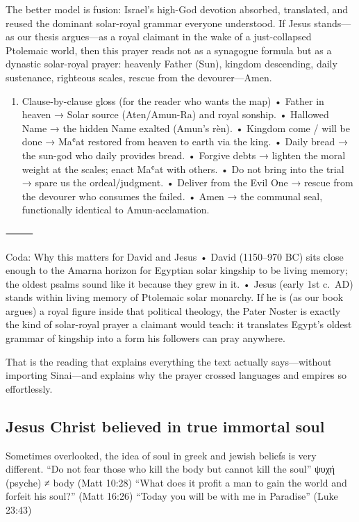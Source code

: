 The better model is fusion: Israel's high-God devotion absorbed, translated, and reused the dominant solar-royal grammar everyone understood.
If Jesus stands---as our thesis argues---as a royal claimant in the wake of a just-collapsed Ptolemaic world, then this prayer reads not as a synagogue formula but as a dynastic solar-royal prayer: heavenly Father (Sun), kingdom descending, daily sustenance, righteous scales, rescue from the devourer---Amen.

\begin{enumerate}
\def\labelenumi{\arabic{enumi})}
\setcounter{enumi}{5}
\tightlist
\item
  Clause-by-clause gloss (for the reader who wants the map) • Father in heaven → Solar source (Aten/Amun-Ra) and royal sonship.
• Hallowed Name → the hidden Name exalted (Amun's rèn).
• Kingdom come / will be done → Maʿat restored from heaven to earth via the king.
• Daily bread → the sun-god who daily provides bread.
• Forgive debts → lighten the moral weight at the scales; enact Maʿat with others.
• Do not bring into the trial → spare us the ordeal/judgment.
• Deliver from the Evil One → rescue from the devourer who consumes the failed.
• Amen → the communal seal, functionally identical to Amun-acclamation.
\end{enumerate}

⸻

Coda: Why this matters for David and Jesus • David (1150--970 BC) sits close enough to the Amarna horizon for Egyptian solar kingship to be living memory; the oldest psalms sound like it because they grew in it.
• Jesus (early 1st c.~AD) stands within living memory of Ptolemaic solar monarchy.
If he is (as our book argues) a royal figure inside that political theology, the Pater Noster is exactly the kind of solar-royal prayer a claimant would teach: it translates Egypt's oldest grammar of kingship into a form his followers can pray anywhere.

That is the reading that explains everything the text actually says---without importing Sinai---and explains why the prayer crossed languages and empires so effortlessly.

\subsection{Jesus Christ believed in true immortal soul}\label{par:sec:jesus-christ-believed-in-true-immortal-soul}

Sometimes overlooked, the idea of soul in greek and jewish beliefs is very different.
``Do not fear those who kill the body but cannot kill the soul'' ψυχή (psyche) ≠ body (Matt 10:28) ``What does it profit a man to gain the world and forfeit his soul?'' (Matt 16:26) ``Today you will be with me in Paradise'' (Luke 23:43)

